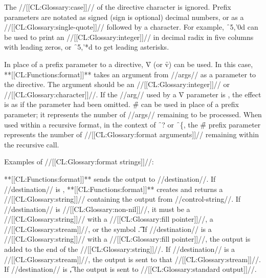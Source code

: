 The //[[CL:Glossary:case]]// of the directive character is ignored. Prefix parameters are notated as signed (sign is optional) decimal numbers, or as a //[[CL:Glossary:single-quote]]// followed by a character. For example, \f{~5,'0d} can be used to print an //[[CL:Glossary:integer]]//  in decimal radix in five columns with leading zeros, or \f{~5,'*d} to get leading asterisks.

In place of a prefix parameter to a directive, \f{V} (or \f{v}) can be used.  In this case, **[[CL:Functions:format]]** takes an argument from //args// as a parameter to the directive.  The argument should be an //[[CL:Glossary:integer]]// or //[[CL:Glossary:character]]//. If the //arg// used by a \f{V} parameter is \nil, the effect is as if the parameter had been omitted. \f{\#} can be used in place of a prefix parameter; it represents the number of //args// remaining to be processed. When used within a recursive format, in the context of \f{~?} or \f{~\{}, the \f{\#} prefix parameter represents the number of //[[CL:Glossary:format arguments]]// remaining within the recursive call.

Examples of //[[CL:Glossary:format strings]]//:


**[[CL:Functions:format]]** sends the output to //destination//. If //destination// is \nil, **[[CL:Functions:format]]** creates and returns a //[[CL:Glossary:string]]//  containing the output from //control-string//. If //destination// is //[[CL:Glossary:non-nil]]//,  it must be a //[[CL:Glossary:string]]// with a //[[CL:Glossary:fill pointer]]//,  a //[[CL:Glossary:stream]]//, or the symbol \t. If //destination// is a //[[CL:Glossary:string]]// with a //[[CL:Glossary:fill pointer]]//,  the output is added to the end of the //[[CL:Glossary:string]]//.  If //destination// is a //[[CL:Glossary:stream]]//,  the output is sent to that //[[CL:Glossary:stream]]//.  If //destination// is \t, the output is sent to //[[CL:Glossary:standard output]]//.

